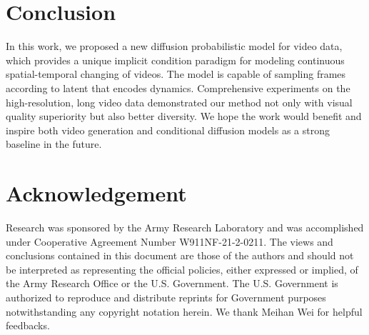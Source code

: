 \documentclass[letterpaper]{article}
\begin{document}
\section{Conclusion}
In this work, we proposed a new diffusion probabilistic model for video data, which provides a unique implicit condition paradigm for modeling continuous spatial-temporal changing of videos.
The model is capable of sampling frames according to latent that encodes dynamics.
Comprehensive experiments on the high-resolution, long video data demonstrated our method not only with visual quality superiority but also better diversity.
We hope the work would benefit and inspire both video generation and conditional diffusion models as a strong baseline in the future. 

\section{Acknowledgement}
Research was sponsored by the Army Research Laboratory and was accomplished under Cooperative Agreement Number W911NF-21-2-0211. The views and conclusions contained in this document are those of the authors and should not be interpreted as representing the official policies, either expressed or implied, of the Army Research Office or the U.S. Government. The U.S. Government is authorized to reproduce and distribute reprints for Government purposes notwithstanding any copyright notation herein.
We thank Meihan Wei for helpful feedbacks.


\end{document}
